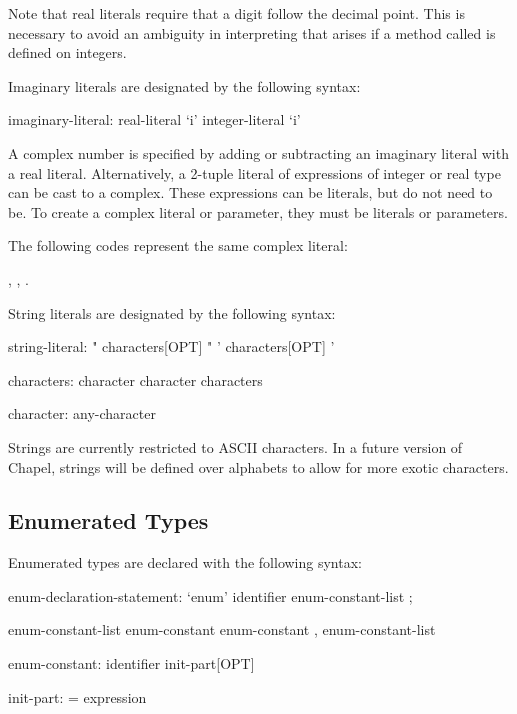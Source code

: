 Note that real literals require that a digit follow the
decimal point.  This is necessary to avoid an ambiguity in
interpreting  that arises if a method called  is
defined on integers.

Imaginary literals are designated by the following syntax:
\begin{syntax}
imaginary-literal:
  real-literal `i'
  integer-literal `i'
\end{syntax}

A complex number is specified by adding or subtracting an imaginary
literal with a real literal.  Alternatively, a 2-tuple literal of
expressions of integer or real type can be cast to a complex.  These
expressions can be literals, but do not need to be.  To create a
complex literal or parameter, they must be literals or parameters.

\begin{example}
The following codes represent the same complex literal:
\begin{center}
, \hspace{1pc} , \hspace{1pc}
.
\end{center}
\end{example}

String literals are designated by the following syntax:
\begin{syntax}
string-literal:
  " characters[OPT] "
  ' characters[OPT] '

characters:
  character
  character characters

character:
  any-character
\end{syntax}

\begin{status}
Strings are currently restricted to ASCII characters.  In a future
version of Chapel, strings will be defined over alphabets to allow for
more exotic characters.
\end{status}

\subsection{Enumerated Types}
\label{Enumerated_Types}

Enumerated types are declared with the following syntax:
\begin{syntax}
enum-declaration-statement:
  `enum' identifier { enum-constant-list } ;

enum-constant-list
  enum-constant
  enum-constant , enum-constant-list

enum-constant:
  identifier init-part[OPT]

init-part:
  = expression
\end{syntax}

